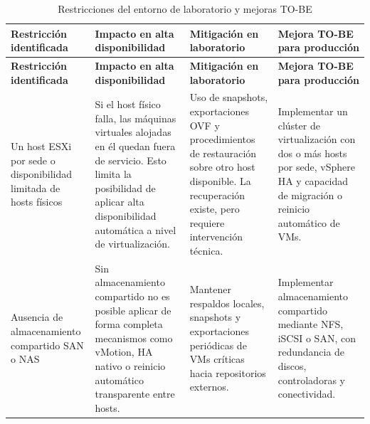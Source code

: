 \documentclass[11pt, a4paper, oneside]{report}
\begin{document}
\begin{landscape}
\thispagestyle{fancy}

\renewcommand{\arraystretch}{1.3}
\footnotesize
{}

\begin{xltabular}{\linewidth}{@{}|L{3.8cm}|L{4.5cm}|L{5.5cm}|X|@{}}
\caption{Restricciones del entorno de laboratorio y mejoras TO-BE}
\label{tab:restricciones_laboratorio_tobe} \\

\parbox[c][1.1cm][c]{\linewidth}{\centering\color{white}\bfseries\small Restricción identificada} &
\parbox[c][1.1cm][c]{\linewidth}{\centering\color{white}\bfseries\small Impacto en alta disponibilidad} &
\parbox[c][1.1cm][c]{\linewidth}{\centering\color{white}\bfseries\small Mitigación en laboratorio} &
\parbox[c][1.1cm][c]{\linewidth}{\centering\color{white}\bfseries\small Mejora TO-BE para producción} \\ \hline
\endfirsthead

\parbox[c][1.1cm][c]{\linewidth}{\centering\color{white}\bfseries\small Restricción identificada} &
\parbox[c][1.1cm][c]{\linewidth}{\centering\color{white}\bfseries\small Impacto en alta disponibilidad} &
\parbox[c][1.1cm][c]{\linewidth}{\centering\color{white}\bfseries\small Mitigación en laboratorio} &
\parbox[c][1.1cm][c]{\linewidth}{\centering\color{white}\bfseries\small Mejora TO-BE para producción} \\ \hline
\endhead

\hline
\endfoot

{\small Un host ESXi por sede o disponibilidad limitada de hosts físicos} &
{\small Si el host físico falla, las máquinas virtuales alojadas en él quedan fuera de servicio. Esto limita la posibilidad de aplicar alta disponibilidad automática a nivel de virtualización.} &
{\small Uso de snapshots, exportaciones OVF y procedimientos de restauración sobre otro host disponible. La recuperación existe, pero requiere intervención técnica.} &
{\small Implementar un clúster de virtualización con dos o más hosts por sede, vSphere HA y capacidad de migración o reinicio automático de VMs.} \\ \hline

{\small Ausencia de almacenamiento compartido SAN o NAS} &
{\small Sin almacenamiento compartido no es posible aplicar de forma completa mecanismos como vMotion, HA nativo o reinicio automático transparente entre hosts.} &
{\small Mantener respaldos locales, snapshots y exportaciones periódicas de VMs críticas hacia repositorios externos.} &
{\small Implementar almacenamiento compartido mediante NFS, iSCSI o SAN, con redundancia de discos, controladoras y conectividad.} \\ \hline


\end{xltabular}
\end{landscape}
\end{document}
